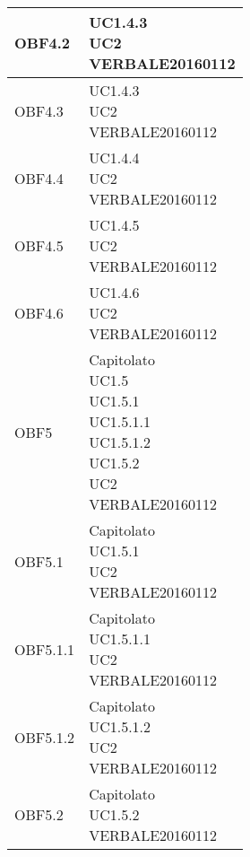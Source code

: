 \documentclass{scalatekids-article}
\begin{document}
\begin{longtable}[H]{|p{5.5cm}|p{5.5cm}|}
  \hline
  OBF4.2 & \multiLineCell[t]{UC1.4.3\\UC2\\VERBALE20160112\\}\\
  \hline
  OBF4.3 & \multiLineCell[t]{UC1.4.3\\UC2\\VERBALE20160112\\}\\
  \hline
  OBF4.4 & \multiLineCell[t]{UC1.4.4\\UC2\\VERBALE20160112\\}\\
  \hline
  OBF4.5 & \multiLineCell[t]{UC1.4.5\\UC2\\VERBALE20160112\\}\\
  \hline
  OBF4.6 & \multiLineCell[t]{UC1.4.6\\UC2\\VERBALE20160112\\}\\
  \hline
  OBF5 & \multiLineCell[t]{Capitolato\\UC1.5\\UC1.5.1\\UC1.5.1.1\\UC1.5.1.2\\UC1.5.2\\UC2\\VERBALE20160112\\}\\
  \hline
  OBF5.1 & \multiLineCell[t]{Capitolato\\UC1.5.1\\UC2\\VERBALE20160112\\}\\
  \hline
  OBF5.1.1 & \multiLineCell[t]{Capitolato\\UC1.5.1.1\\UC2\\VERBALE20160112\\}\\
  \hline
  OBF5.1.2 & \multiLineCell[t]{Capitolato\\UC1.5.1.2\\UC2\\VERBALE20160112\\}\\
  \hline
  OBF5.2 & \multiLineCell[t]{Capitolato\\UC1.5.2\\VERBALE20160112\\}\\

\end{longtable}
\end{document}
